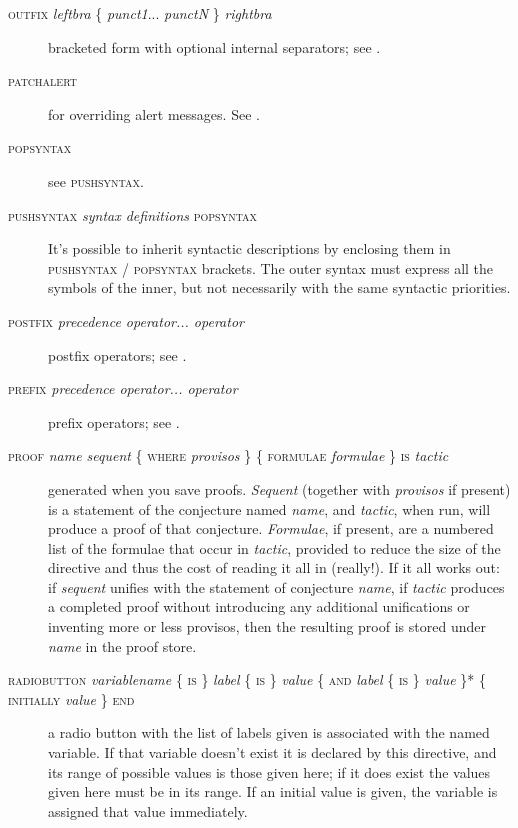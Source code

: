\begin{description}
\item[\textsc{outfix} \textit{leftbra} \{ \textit{punct1}... \textit{punctN} \} \textit{rightbra}] bracketed form with optional internal separators; see .

\item[\textsc{patchalert}] for overriding alert messages. See .

\item[\textsc{popsyntax}] see \textsc{pushsyntax}.

\item[\textsc{pushsyntax} \textit{syntax definitions} \textsc{popsyntax}] It's possible to inherit  syntactic descriptions by enclosing them in \textsc{pushsyntax} / \textsc{popsyntax} brackets. The outer syntax must express all the symbols of the inner, but not necessarily with the same syntactic priorities.

\item[\textsc{postfix} \textit{precedence operator... operator}] postfix operators; see .

\item[\textsc{prefix} \textit{precedence operator... operator}] prefix operators; see .

\item[\textsc{proof} \textit{name sequent} \{ \textsc{where} \textit{provisos} \} \{ \textsc{formulae} \textit{formulae} \} \textsc{is} \textit{tactic}] generated when you save proofs. \textit{Sequent} (together with \textit{provisos} if present) is a statement of the conjecture named \textit{name}, and \textit{tactic}, when run, will produce a proof of that conjecture. \textit{Formulae}, if present, are a numbered list of the formulae that occur in \textit{tactic}, provided to reduce the size of the directive and thus the cost of reading it all in (really!). If it all works out: if \textit{sequent} unifies with the statement of conjecture \textit{name}, if \textit{tactic} produces a completed proof without introducing any additional unifications or inventing more or less provisos, then the resulting proof is stored under \textit{name} in the proof store.

\item[\textsc{radiobutton} \textit{variablename} \{ \textsc{is} \} \textit{label} \{ \textsc{is} \} \textit{value} \{ \textsc{and} \textit{label} \{ \textsc{is} \} \textit{value} \}* \{ \textsc{initially} \textit{value} \} \textsc{end}] a radio button with the list of labels given is associated with the named variable. If that variable doesn't exist it is declared by this directive, and its range of possible values is those given here; if it does exist the values given here must be in its range. If an initial value is given, the variable is assigned that value immediately.


\end{description}
